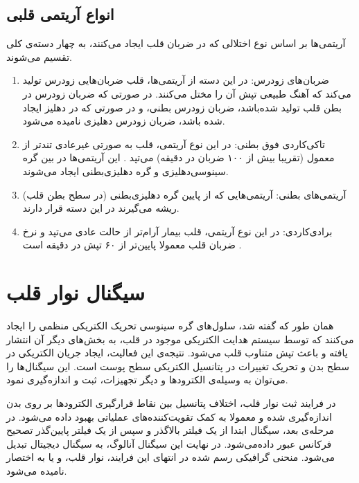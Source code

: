 \subsection{انواع آریتمی قلبی}
آریتمی‌ها بر اساس نوع اختلالی که در ضربان قلب ایجاد می‌کنند، به چهار دسته‌ی کلی تقسیم می‌شوند.
\begin{enumerate}
	\item ضربان‌های زودرس: در این دسته از آریتمی‌ها، قلب ضربا‌ن‌هایی زودرس تولید می‌کند که آهنگ طبیعی تپش آن را مختل می‌کنند. در صورتی که ضربان زودرس در بطن قلب تولید شده‌باشد، ضربان زودرس بطنی، و در صورتی که در دهلیز ایجاد شده باشد، ضربان زودرس دهلیزی نامیده می‌شود.
	\item تاکی‌کاردی فوق بطنی: در این نوع آریتمی، قلب به صورتی غیرعادی تندتر از معمول  (تقریبا بیش از ۱۰۰ ضربان در دقیقه) می‌تپد \cite{Amboss}. این آریتمی‌ها در بین گره سینوسی‌دهلیزی و گره دهلیزی‌بطنی ایجاد می‌شوند. 
	\item آریتمی‌های بطنی:  آریتمی‌هایی که از پایین گره دهلیزی‌بطنی (در سطح بطن قلب) ریشه می‌گیرند در این دسته قرار دارند.
	\item برادی‌کاردی: در این نوع آریتمی، قلب بیمار آرام‌تر از حالت عادی می‌تپد و نرخ ضربان قلب معمولا پایین‌تر از ۶۰ تپش در دقیقه است  \cite{Verywellhealth}.

\end{enumerate}

\section{سیگنال نوار قلب}
همان طور که گفته شد، سلول‌های گره سینوسی تحریک الکتریکی منظمی را ایجاد می‌کنند که توسط سیستم هدایت الکتریکی موجود در قلب، به بخش‌های دیگر آن انتشار یافته و باعث تپش متناوب قلب می‌شود. نتیجه‌ی این فعالیت، ایجاد جریان الکتریکی در سطح بدن و تحریک تغییرات در پتانسیل الکتریکی سطح پوست است. این سیگنال‌ها را می‌توان به وسیله‌ی الکترودها و دیگر تجهیزات، ثبت و اندازه‌گیری نمود.

در فرایند ثبت نوار قلب، اختلاف پتانسیل بین نقاط قرارگیری الکترودها بر روی بدن اندازه‌گیری شده و معمولا به کمک تقویت‌کننده‌های عملیاتی بهبود داده می‌شود. در مرحله‌ی بعد، سیگنال ابتدا از یک فیلتر بالاگذر و سپس از یک فیلتر پایین‌گذر تصحیح فرکانس عبور داده‌می‌شود. در نهایت این سیگنال آنالوگ، به سیگنال دیجیتال تبدیل می‌شود. منحنی گرافیکی رسم شده در انتهای این فرایند، نوار قلب، و یا به اختصار  نامیده می‌شود. 

